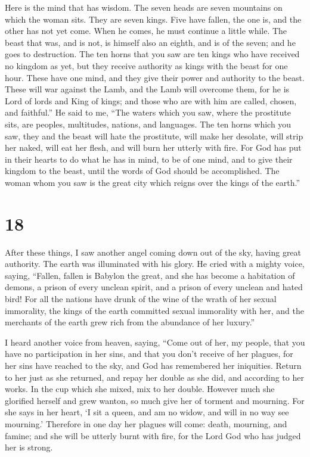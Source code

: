  Here is the mind that has wisdom. The seven heads are seven
mountains on which the woman sits.  They are seven kings.
Five have fallen, the one is, and the other has not yet come. When he
comes, he must continue a little while.  The beast that
was, and is not, is himself also an eighth, and is of the seven; and he
goes to destruction.  The ten horns that you saw are ten
kings who have received no kingdom as yet, but they receive authority as
kings with the beast for one hour.  These have one mind,
and they give their power and authority to the beast. 
These will war against the Lamb, and the Lamb will overcome them, for he
is Lord of lords and King of kings; and those who are with him are
called, chosen, and faithful.''  He said to me, ``The
waters which you saw, where the prostitute sits, are peoples,
multitudes, nations, and languages.  The ten horns which
you saw, they and the beast will hate the prostitute, will make her
desolate, will strip her naked, will eat her flesh, and will burn her
utterly with fire.  For God has put in their hearts to do
what he has in mind, to be of one mind, and to give their kingdom to the
beast, until the words of God should be accomplished.  The
woman whom you saw is the great city which reigns over the kings of the
earth.''

\hypertarget{section-17}{%
\section{18}\label{section-17}}

 After these things, I saw another angel coming down out of
the sky, having great authority. The earth was illuminated with his
glory.  He cried with a mighty voice, saying, ``Fallen,
fallen is Babylon the great, and she has become a habitation of demons,
a prison of every unclean spirit, and a prison of every unclean and
hated bird!  For all the nations have drunk of the wine of
the wrath of her sexual immorality, the kings of the earth committed
sexual immorality with her, and the merchants of the earth grew rich
from the abundance of her luxury.''

 I heard another voice from heaven, saying, ``Come out of
her, my people, that you have no participation in her sins, and that you
don't receive of her plagues,  for her sins have reached to
the sky, and God has remembered her iniquities.  Return to
her just as she returned, and repay her double as she did, and according
to her works. In the cup which she mixed, mix to her double.
 However much she glorified herself and grew wanton, so much
give her of torment and mourning. For she says in her heart, `I sit a
queen, and am no widow, and will in no way see mourning.' 
Therefore in one day her plagues will come: death, mourning, and famine;
and she will be utterly burnt with fire, for the Lord God who has judged
her is strong.

